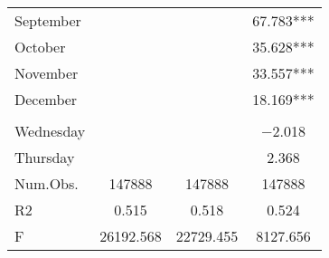 \documentclass[3p, authoryear]{elsarticle} %
\begin{document}
\begin{table}
\begin{tabular}[t]{lccc}
\hspace{1em}September &  &  & \num{67.783}***\\
\hspace{1em}October &  &  & \num{35.628}***\\
\hspace{1em}November &  &  & \num{33.557}***\\
\hspace{1em}December &  &  & \num{18.169}***\\
\addlinespace[0.3em]
\multicolumn{4}{l}{\textbf{Day}}\\
\hspace{1em}Wednesday &  &  & \num{-2.018}\\
\hspace{1em}Thursday &  &  & \num{2.368}\\
\midrule
Num.Obs. & \num{147888} & \num{147888} & \num{147888}\\
R2 & \num{0.515} & \num{0.518} & \num{0.524}\\
F & \num{26192.568} & \num{22729.455} & \num{8127.656}\\
\bottomrule
\end{tabular}
\end{table}


\end{document}
